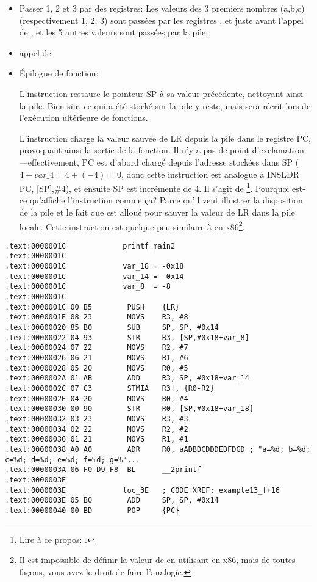 \begin{itemize}
\item Passer 1, 2 et 3 par des registres:
Les valeurs des 3 premiers nombres (a,b,c) (respectivement 1, 2, 3) sont passées
par les registres ,  et  juste avant l'appel de \printf, et
les 5 autres valeurs sont passées par la pile:

\item appel de \printf

\item Épilogue de fonction:

L'instruction  restaure le pointeur \ac{SP} à sa valeur
précédente, nettoyant ainsi la pile.
Bien sûr, ce qui a été stocké sur la pile y reste, mais sera récrit lors de
l'exécution ultérieure de fonctions.

L'instruction  charge la valeur sauvée de \ac{LR}
depuis la pile dans le registre \ac{PC}, provoquant ainsi la sortie de la fonction.
Il n'y a pas de point d'exclamation---effectivement, \ac{PC} est d'abord chargé
depuis l'adresse stockées dans \ac{SP} ($4+var\_4=4+(-4)=0$, donc cette instruction
est analogue à INS{LDR PC, [SP],\#4}), et ensuite \ac{SP} est incrémenté de 4.
Il s'agit de \footnote{Lire à ce propos: .}.
Pourquoi est-ce qu'\IDA affiche l'instruction comme ça?
Parce qu'il veut illustrer la disposition de la pile et le fait que 
est alloué pour sauver la valeur de \ac{LR} dans la pile locale.
Cette instruction est quelque peu similaire à  en x86\footnote{Il est
impossible de définir la valeur de  en utilisant \POP en x86, mais
de toutes façons, vous avez le droit de faire l'analogie.}.

\end{itemize}

\myparagraph{\OptimizingKeilVI: \ThumbMode}

\begin{lstlisting}[style=customasmARM]
.text:0000001C             printf_main2
.text:0000001C
.text:0000001C             var_18 = -0x18
.text:0000001C             var_14 = -0x14
.text:0000001C             var_8  = -8
.text:0000001C
.text:0000001C 00 B5        PUSH    {LR}
.text:0000001E 08 23        MOVS    R3, #8
.text:00000020 85 B0        SUB     SP, SP, #0x14
.text:00000022 04 93        STR     R3, [SP,#0x18+var_8]
.text:00000024 07 22        MOVS    R2, #7
.text:00000026 06 21        MOVS    R1, #6
.text:00000028 05 20        MOVS    R0, #5
.text:0000002A 01 AB        ADD     R3, SP, #0x18+var_14
.text:0000002C 07 C3        STMIA   R3!, {R0-R2}
.text:0000002E 04 20        MOVS    R0, #4
.text:00000030 00 90        STR     R0, [SP,#0x18+var_18]
.text:00000032 03 23        MOVS    R3, #3
.text:00000034 02 22        MOVS    R2, #2
.text:00000036 01 21        MOVS    R1, #1
.text:00000038 A0 A0        ADR     R0, aADBDCDDDEDFDGD ; "a=%d; b=%d; c=%d; d=%d; e=%d; f=%d; g=%"...
.text:0000003A 06 F0 D9 F8  BL      __2printf
.text:0000003E
.text:0000003E             loc_3E   ; CODE XREF: example13_f+16
.text:0000003E 05 B0        ADD     SP, SP, #0x14
.text:00000040 00 BD        POP     {PC}
\end{lstlisting}

